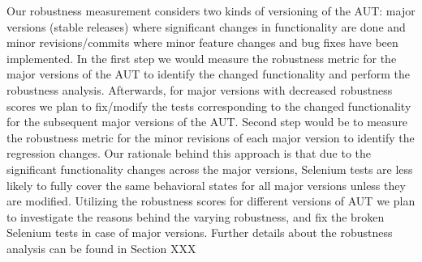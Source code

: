 Our robustness measurement considers two kinds of versioning of the AUT: major versions (stable releases) where significant changes in functionality are done and minor revisions/commits where minor feature changes and bug fixes have been implemented.  In the first step we would measure the robustness metric for the major versions of the AUT to identify the changed functionality and perform the robustness analysis. Afterwards, for major versions with decreased robustness scores we plan to fix/modify the tests corresponding to the changed functionality for the subsequent major versions of the AUT. Second step would be to measure the robustness metric for the minor revisions of each major version to identify the regression changes. Our rationale behind this approach is that due to the significant functionality changes across the major versions, Selenium tests are less likely to fully cover the same behavioral states for all major versions unless they are modified. Utilizing the robustness scores for different versions of AUT we plan to investigate the reasons behind the varying robustness, and fix the broken Selenium tests in case of major versions. Further details about the robustness analysis  can be found in Section XXX


